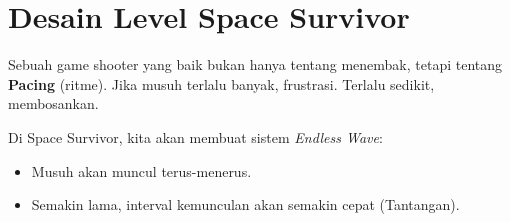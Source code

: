 
\section{Desain Level Space Survivor}

Sebuah game shooter yang baik bukan hanya tentang menembak, tetapi tentang \textbf{Pacing} (ritme). Jika musuh terlalu banyak, frustrasi. Terlalu sedikit, membosankan.

Di Space Survivor, kita akan membuat sistem \textit{Endless Wave}:
\begin{itemize}
    \item Musuh akan muncul terus-menerus.
    \item Semakin lama, interval kemunculan akan semakin cepat (Tantangan).
\end{itemize}
